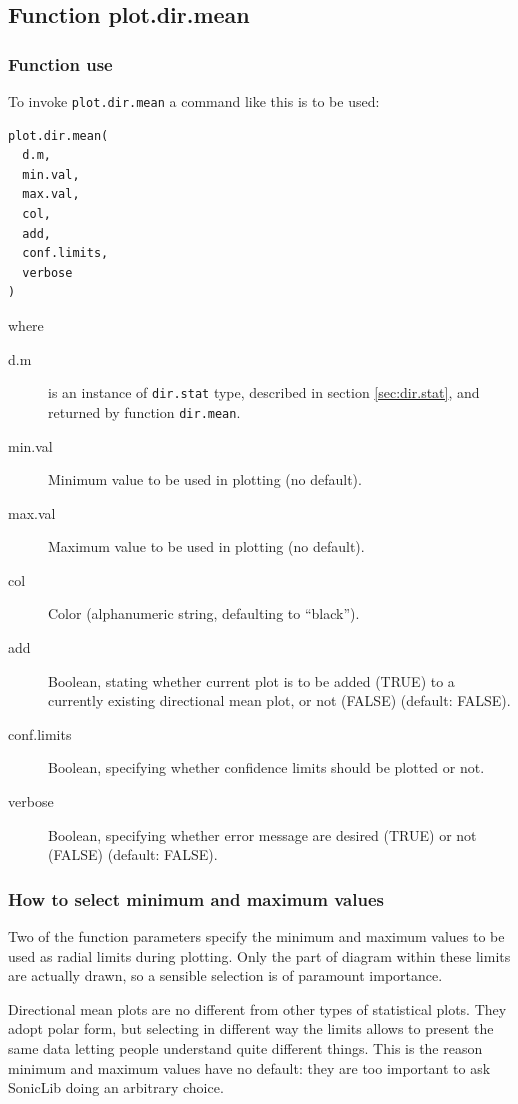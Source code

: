 \documentclass[a4paper,10pt]{book}
\begin{document}
\subsection{Function plot.dir.mean}
\subsubsection{Function use}

To invoke \verb|plot.dir.mean| a command like this is to be used:

\begin{verbatim}
plot.dir.mean(
  d.m,
  min.val,
  max.val,
  col,
  add,
  conf.limits,
  verbose
)
\end{verbatim}

\noindent where

\begin{description}
 \item[d.m] is an instance of \verb|dir.stat| type, described in section \ref{sec:dir.stat}, and returned by function \verb|dir.mean|.
 \item[min.val] Minimum value to be used in plotting (no default).
 \item[max.val] Maximum value to be used in plotting (no default).
 \item[col] Color (alphanumeric string, defaulting to ``black'').
 \item[add] Boolean, stating whether current plot is to be added (TRUE) to a currently existing directional mean plot, or not (FALSE) (default: FALSE).
 \item[conf.limits] Boolean, specifying whether confidence limits should be plotted or not.
 \item[verbose] Boolean, specifying whether error message are desired (TRUE) or not (FALSE) (default: FALSE).
\end{description}

\subsubsection{How to select minimum and maximum values}

Two of the function parameters specify the minimum and maximum values to be used as radial limits during plotting. Only the part of diagram within these limits are actually drawn, so a sensible selection is of paramount importance.

Directional mean plots are no different from other types of statistical plots. They adopt polar form, but selecting in different way the limits allows to present the same data letting people understand quite different things. This is the reason minimum and maximum values have no default: they are too important to ask SonicLib doing an arbitrary choice.
\end{document}
